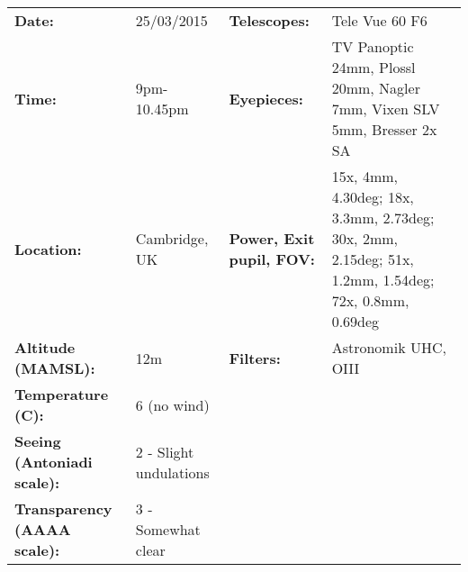 \begin{tabular}{ p{1.7in} p{1.2in} p{1.5in} p{4.2in}}
{\bf Date:} & 25/03/2015 & {\bf Telescopes:} & Tele Vue 60 F6 \\ 
{\bf Time:} & 9pm-10.45pm & {\bf Eyepieces:} & TV Panoptic 24mm, Plossl 20mm, Nagler 7mm, Vixen SLV 5mm, Bresser 2x SA \\ 
{\bf Location:} & Cambridge, UK & {\bf Power, Exit pupil, FOV:} & 15x, 4mm, 4.30deg; 18x, 3.3mm, 2.73deg; 30x, 2mm, 2.15deg; 51x, 1.2mm, 1.54deg; 72x, 0.8mm, 0.69deg \\ 
{\bf Altitude (MAMSL):} & 12m & {\bf Filters:} & Astronomik UHC, OIII \\ 
{\bf Temperature (C):} & 6 (no wind) & & \\ 
{\bf Seeing (Antoniadi scale):} & 2 - Slight undulations & & \\ 
{\bf Transparency (AAAA scale):} & 3 - Somewhat clear & & \\ 
\end{tabular}
\centering 
